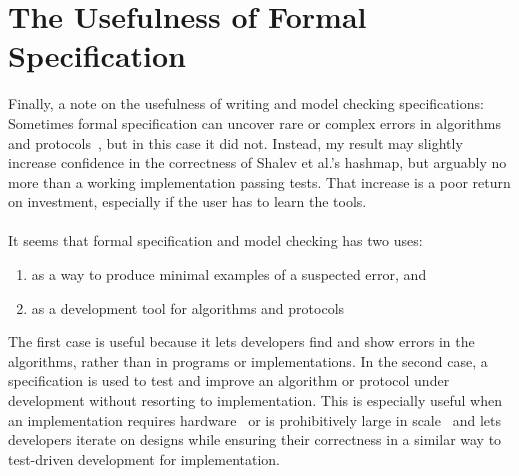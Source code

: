 \documentclass{uit-thesis}
\begin{document}
\section{The Usefulness of Formal Specification}
Finally, a note on the usefulness of writing and model checking specifications: Sometimes formal specification can uncover rare or complex errors in algorithms and protocols~\cite{Lund2019, Zave2012}, but in this case it did not. Instead, my result may slightly increase confidence in the correctness of Shalev et al.'s hashmap, but arguably no more than a working implementation passing tests. That increase is a poor return on investment, especially if the user has to learn the tools.
\\\\
It seems that formal specification and model checking has two uses:
\begin{enumerate}
    \item as a way to produce minimal examples of a suspected error, and \label{point:error}
    \item as a development tool for algorithms and protocols \label{point:dev}
\end{enumerate}
The first case is useful because it lets developers find and show errors in the algorithms, rather than in programs or implementations. In the second case, a specification is used to test and improve an algorithm or protocol under development without resorting to implementation. This is especially useful when an implementation requires hardware~\cite{Lamport-Batson2002} or is prohibitively large in scale~\cite{Amazon2015} and lets developers iterate on designs while ensuring their correctness in a similar way to test-driven development for implementation.
\end{document}
